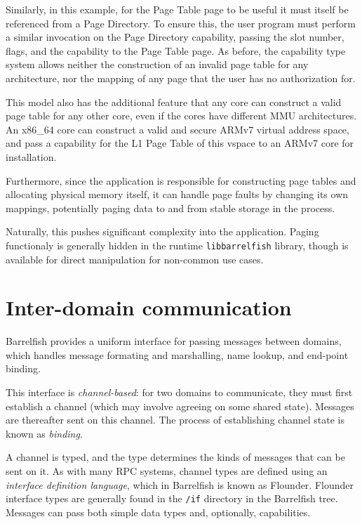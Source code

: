 \documentclass[a4paper,twoside]{report} %
\begin{document}
Similarly, in this example, for the Page Table page to be useful it
must itself be referenced from a Page Directory.  To ensure this, the
user program must perform a similar invocation on the Page Directory
capability, passing the slot number, flags, and the capability to the
Page Table page.  As before, the capability type system allows neither
the construction of an invalid page table for any architecture, nor
the mapping of any page that the user has no authorization for. 

This model also has the additional feature that any core can construct
a valid page table for any other core, even if the cores have
different MMU architectures.  An x86\_64 core can construct a valid
and secure ARMv7 virtual address space, and pass a capability for the
L1 Page Table of this vspace to an ARMv7 core for installation. 

Furthermore, since the application is responsible for constructing
page tables and allocating physical memory itself, it can handle page
faults by changing its own mappings, potentially paging data to and
from stable storage in the process. 

Naturally, this pushes significant complexity into the application.
Paging functionaly is generally hidden in the runtime
\texttt{libbarrelfish} library, though is available for direct
manipulation for non-common use cases. 

\section{Inter-domain communication}

Barrelfish provides a uniform interface for passing messages between
domains, which handles message formating and marshalling, name
lookup, and end-point binding.  

This interface is \emph{channel-based}: for two domains to
communicate, they must first establish a channel (which may involve
agreeing on some shared state).  Messages are thereafter sent on this
channel.  The process of establishing channel state is known as
\emph{binding}.

A channel is typed, and the type determines the kinds of messages that
can be sent on it.  As with many RPC systems, channel types are
defined using an \emph{interface definition language}, which in
Barrelfish is known as Flounder.    Flounder interface types are
generally found in the \texttt{/if} directory in the Barrelfish tree.
Messages can pass both simple data types and, optionally,
capabilities. 
\end{document}
